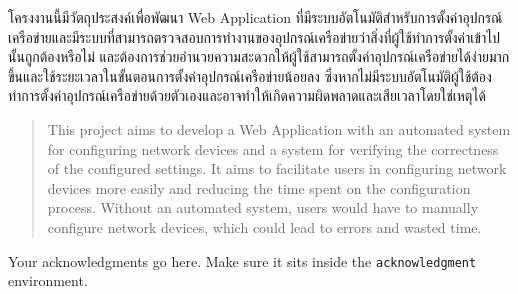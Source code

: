 \maketitle
\makesignature

\ifproject
\begin{abstractTH}
\hspace{0.5in}โครงงานนี้มีวัตถุประสงค์เพื่อพัฒนา Web Application ที่มีระบบอัตโนมัติสำหรับการตั้งค่าอุปกรณ์เครือข่ายและมีระบบที่สามารถตรวจสอบการทำงานของอุปกรณ์เครือข่ายว่าสิ่งที่ผู้ใช้ทำการตั้งค่าเข้าไปนั้นถูกต้องหรือไม่ และต้องการช่วยอำนวยความสะดวกให้ผู้ใช้สามารถตั้งค่าอุปกรณ์เครือข่ายได้ง่ายมากขึ้นและใช้ระยะเวลาในขั้นตอนการตั้งค่าอุปกรณ์เครือข่ายน้อยลง ซึ่งหากไม่มีระบบอัตโนมัติผู้ใช้ต้องทำการตั้งค่าอุปกรณ์เครือข่ายด้วยตัวเองและอาจทำให้เกิดความผิดพลาดและเสียเวลาโดยใช่เหตุได้
\end{abstractTH}

\begin{abstract}
    \hspace{0.5in}This project aims to develop a Web Application with an automated system for configuring network devices and a system for verifying the correctness of the configured settings. It aims to facilitate users in configuring network devices more easily and reducing the time spent on the configuration process. Without an automated system, users would have to manually configure network devices, which could lead to errors and wasted time.
\end{abstract}

\iffalse
\begin{dedication}
This document is dedicated to all Chiang Mai University students.

Dedication page is optional.
\end{dedication}
\fi %

\begin{acknowledgments}
Your acknowledgments go here. Make sure it sits inside the
\texttt{acknowledgment} environment.

\end{acknowledgments}%
\fi %

\contentspage

\ifproject
\figurelistpage

\tablelistpage
\fi %



